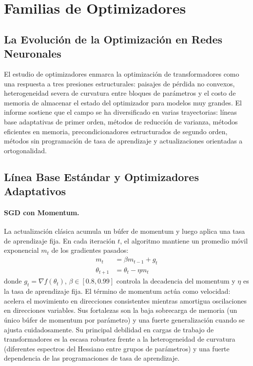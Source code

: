 \section{Familias de Optimizadores}
\label{sec:annex-optimizers}

\subsection{La Evolución de la Optimización en Redes Neuronales}
El estudio de optimizadores enmarca la optimización de transformadores como una respuesta a tres presiones estructurales: paisajes de pérdida no convexos, heterogeneidad severa de curvatura entre bloques de parámetros y el costo de memoria de almacenar el estado del optimizador para modelos muy grandes. El informe sostiene que el campo se ha diversificado en varias trayectorias: líneas base adaptativas de primer orden, métodos de reducción de varianza, métodos eficientes en memoria, precondicionadores estructurados de segundo orden, métodos sin programación de tasa de aprendizaje y actualizaciones orientadas a ortogonalidad.

\subsection{Línea Base Estándar y Optimizadores Adaptativos}
\paragraph{SGD con Momentum.}
La actualización clásica acumula un búfer de momentum y luego aplica una tasa de aprendizaje fija. En cada iteración $t$, el algoritmo mantiene un promedio móvil exponencial $m_t$ de los gradientes pasados:
\begin{align}
m_t &= \beta m_{t-1} + g_t \\
\theta_{t+1} &= \theta_t - \eta m_t
\end{align}
donde $g_t = \nabla f(\theta_t)$, $\beta \in [0.8, 0.99]$ controla la decadencia del momentum y $\eta$ es la tasa de aprendizaje fija. El término de momentum actúa como velocidad: acelera el movimiento en direcciones consistentes mientras amortigua oscilaciones en direcciones variables. Sus fortalezas son la baja sobrecarga de memoria (un único búfer de momentum por parámetro) y una fuerte generalización cuando se ajusta cuidadosamente. Su principal debilidad en cargas de trabajo de transformadores es la escasa robustez frente a la heterogeneidad de curvatura (diferentes espectros del Hessiano entre grupos de parámetros) y una fuerte dependencia de las programaciones de tasa de aprendizaje.

